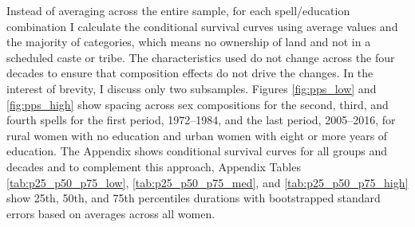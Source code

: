 \documentclass[12pt,letterpaper]{article}
\begin{document}
Instead of averaging across the entire sample, for each spell/education combination I 
calculate the conditional survival curves using average values and the majority of
categories, which means no ownership of land and not in a scheduled caste or tribe.
The characteristics used do not change across the four decades to ensure that composition 
effects do not drive the changes.
In the interest of brevity, I discuss only two subsamples.
Figures \ref{fig:pps_low} and \ref{fig:pps_high} show spacing across sex compositions for 
the second, third, and fourth spells for the first period, 1972--1984, and the last 
period, 2005--2016, for rural women with no education and urban women with eight or 
more years of education.
The Appendix shows conditional survival curves for all groups and decades and to 
complement this approach, Appendix Tables \ref{tab:p25_p50_p75_low}, 
\ref{tab:p25_p50_p75_med}, and \ref{tab:p25_p50_p75_high} show 25th, 50th, and 75th 
percentiles durations with bootstrapped standard errors based on averages across all women.



\end{document}

